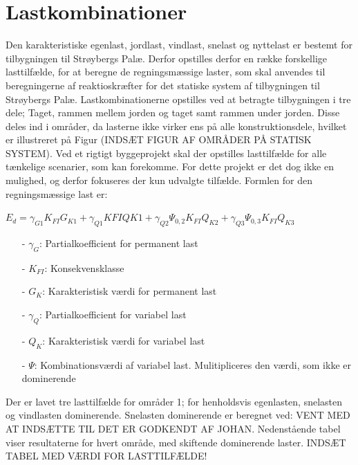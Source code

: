 \section{Lastkombinationer}
Den karakteristiske egenlast, jordlast, vindlast, snelast og nyttelast er bestemt for tilbygningen til Strøybergs Palæ. Derfor opstilles derfor en række forskellige lasttilfælde, for at beregne de regningsmæssige laster, som skal anvendes til beregningerne af reaktioskræfter for det statiske system af tilbygningen til Strøybergs Palæ.
\newline \indent{     }  Lastkombinationerne opstilles ved at betragte tilbygningen i tre dele; Taget, rammen mellem jorden og taget samt rammen under jorden. Disse deles ind i områder, da lasterne ikke virker ens på alle konstruktionsdele, hvilket er illustreret på Figur (INDSÆT FIGUR AF OMRÅDER PÅ STATISK SYSTEM).
\newline
\newline
Ved et rigtigt byggeprojekt skal der opstilles lasttilfælde for alle tænkelige scenarier, som kan forekomme. For dette projekt er det dog ikke en mulighed, og derfor fokuseres der kun udvalgte tilfælde.
\newline
\newline
Formlen for den regningsmæssige last er:
\begin{center}
	$E_d = \gamma_{G1} K_{FI} G_{K1} + \gamma_{Q1} K{FI} Q{K1} + \gamma_{Q2} \Psi_{0,2} K_{FI} Q_{K2} + \gamma_{Q3} \Psi_{0,3} K_{FI} Q_{K3}$ 
\end{center}

\begin{itemize}
	\item[-] $\gamma_G$: Partialkoefficient for permanent last
	\item[-] $K_{FI}$: Konsekvensklasse
	\item[-] $G_K$: Karakteristisk værdi for permanent last
	\item[-] $\gamma_Q$: Partialkoefficient for variabel last
	\item[-] $Q_K$: Karakteristisk værdi for variabel last
	\item[-] $\Psi$: Kombinationsværdi af variabel last. Mulitipliceres den værdi, som ikke er dominerende 
\end{itemize}

Der er lavet tre lasttilfælde for områder 1; for henholdsvis egenlasten, snelasten og vindlasten dominerende. Snelasten dominerende er beregnet ved: VENT MED AT INDSÆTTE TIL DET ER GODKENDT AF JOHAN. 
\newline
\newline
Nedenstående tabel viser resultaterne for hvert område, med skiftende dominerende laster.
\newline
\newline
INDSÆT TABEL MED VÆRDI FOR LASTTILFÆLDE!
\newline
\newline